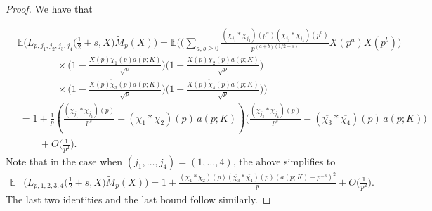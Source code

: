 \documentclass[12pt, reqno]{amsart}
\newcommand{\kommentar}[1]{}
\newcommand{\E}{\mathbb{E}}
\numberwithin{equation}{section}
\numberwithin{theorem}{section}
\numberwithin{equation}{section}
\begin{document}
\begin{proof}
We have that
   \kommentar{
    \begin{align*}
        \E &  \Big(  L_{p,j_1,j_2,j_3,j_4} \big( \tfrac{1}{2}+s,X \big) \widetilde{M}_p(X) \Big) = \E \Bigg( \Big( \sum_{a,b \geq 0} \frac{(\chi_{j_1}*\chi_{j_2})(p^{a})(\overline{\chi_{j_3}}*\overline{\chi_{j_4}})(p^{b})}{p^{(a+b)(1/2+s)}}X(p^{a}) \overline{X(p^{b})} \Big) \\
        & \times \Big(1 - \frac{X(p) \chi_1(p) a(p;K)}{\sqrt{p}} \Big)\Big(1 - \frac{X(p) \chi_2(p) a(p;K)}{\sqrt{p}} \Big) \Big(1 - \frac{\overline{X(p) \chi_3(p)} a(p;K)}{\sqrt{p}} \Big) \\
& \times \Big(1 - \frac{ \overline{X(p) \chi_4(p)}a(p;K)}{\sqrt{p}} \Big) \Bigg) = 1+ \frac{ (\chi_1 * \chi_2)(p) (\overline{\chi_3}*\overline{\chi_4})(p)}{p^{1+2s}}- \frac{2a(p;K)(\chi_1*\chi_2)(p) (\overline{\chi_3}*\overline{\chi_4})(p)}{p^{1+s}} \\
&+ \frac{ (\chi_1 * \chi_2)(p) ( \overline{\chi_3}*\overline{\chi_4})(p)a(p;K)^2}{p} +O \Big(  \frac{1}{p^2} \Big) \\
&= 1+ \frac{ (\chi_1 * \chi_2)(p) (\overline{\chi_3}*\overline{\chi_4})(p)(a(p;K)-p^{-s})^2}{p}+ O \Big(  \frac{1}{p^2} \Big). 
    \end{align*}}
 \begin{align*}
&\E   \Big(  L_{p,j_1,j_2,j_3,j_4} \big( \tfrac{1}{2}+s,X \big) \widetilde{M}_p(X) \Big) = \E \Bigg( \Big( \sum_{a,b \geq 0} \frac{(\chi_{j_1}*\chi_{j_2})(p^{a})(\overline{\chi_{j_3}}*\overline{\chi_{j_4}})(p^{b})}{p^{(a+b)(1/2+s)}}X(p^{a}) \overline{X(p^{b})} \Big) \\
        &\qquad\qquad \times \Big(1 - \frac{X(p) \chi_1(p) a(p;K)}{\sqrt{p}} \Big)\Big(1 - \frac{X(p) \chi_2(p) a(p;K)}{\sqrt{p}} \Big)  \\
&\qquad\qquad \times \Big(1 - \frac{\overline{X(p) \chi_3(p)} a(p;K)}{\sqrt{p}} \Big)\Big(1 - \frac{ \overline{X(p) \chi_4(p)}a(p;K)}{\sqrt{p}} \Big) \Bigg)\\
&\ = 1+  \frac{1}{p}\left(\frac{(\chi_{j_1}*\chi_{j_2})(p)}{p^{s}}-(\chi_1*\chi_2)(p)\,a(p;K)\right)\Big(\frac{(\overline{\chi_{j_3}}*\overline{\chi_{j_4}})(p)}{p^{s}}  -(\overline{\chi_3}*\overline{\chi_4})(p)\,a(p;K)\Big)\\
&\qquad\ + O \Big(  \frac{1}{p^2} \Big).
  \end{align*}
  Note that in the case when $(j_1,\ldots,j_4)=(1,\ldots,4)$, the above simplifies to
  \begin{align*}
  \E &  \Big(  L_{p,1,2,3,4} \big( \tfrac{1}{2}+s,X \big) \widetilde{M}_p(X) \Big) = 1+ \frac{ (\chi_1 * \chi_2)(p) (\overline{\chi_3}*\overline{\chi_4})(p)(a(p;K)-p^{-s})^2}{p}+ O \Big(  \frac{1}{p^2} \Big).
  \end{align*}
  The last two identities and the last bound follow similarly.
\end{proof}
\end{document}
